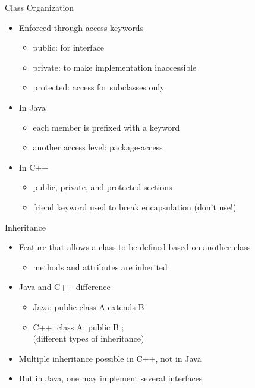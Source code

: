 \documentclass{beamer}
\begin{document}
\begin{frame}{Class Organization}
\begin{itemize}
\item Enforced through access keywords
\begin{itemize}
\item public: for interface
\item private: to make implementation inaccessible
\item protected: access for subclasses only
\end{itemize}
\item In Java
\begin{itemize}
\item each member is prefixed with a keyword
\item another access level:  package-access
\end{itemize}
\item In C++
\begin{itemize}
\item public, private, and protected sections
\item friend keyword used to break encapsulation (don't use!)
\end{itemize}
\end{itemize}
\end{frame}

\begin{frame}{Inheritance}
\begin{itemize}
\item Feature that allows a class to be defined based on another class
\begin{itemize}
\item methods and attributes are inherited
\end{itemize}
\item Java and C++ difference
\begin{itemize}
\item Java:  public class A extends B { }
\item C++:  class A: public B { }; \\
(different types of inheritance)
\end{itemize}
\item Multiple inheritance possible in C++, not in Java
\item But in Java, one may implement several interfaces
\end{itemize}
\end{frame}
\end{document}
